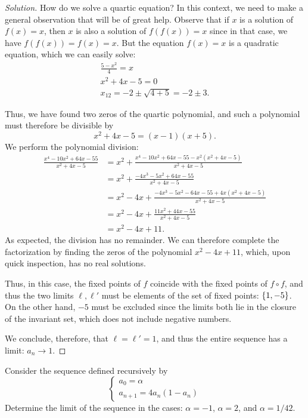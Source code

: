 \begin{proof}[Solution]
How do we solve a quartic equation?
In this context, we need to make a general observation that will be of great
help.
Observe that if $x$ is a solution of $f(x)=x$, then $x$
is also a solution of $f(f(x)) = x$ since in that case, we have
$f(f(x))=f(x)=x$.
But the equation $f(x) = x$ is a quadratic equation, which we can easily solve:
\begin{gather*}
  \frac{5-x^2}{4} = x \\
  x^2 + 4x - 5 = 0 \\
  x_{12} = -2 \pm \sqrt{4 + 5} = -2 \pm 3.
\end{gather*}

Thus, we have found two zeros of the quartic polynomial, and
such a polynomial must therefore be divisible by
\[
 x^2 + 4x - 5 = (x-1)(x+5).
\]
We perform the polynomial division:
\begin{align*}
\frac{x^4 - 10 x^2 + 64 x - 55}{x^2 + 4x - 5}
&= x^2 + \frac{x^4 - 10 x^2 + 64x - 55 - x^2 (x^2 + 4x - 5)}{x^2+4x-5}\\
&= x^2 + \frac{-4x^3 - 5 x^2 + 64 x - 55}{x^2+4x-5}\\
&= x^2 - 4x + \frac{-4x^3 - 5x^2 - 64 x - 55 + 4x(x^2+4x-5)}{x^2+4x-5}
\\
&= x^2 - 4x + \frac{11 x^2 + 44 x - 55}{x^2 + 4x -5}\\
&= x^2 - 4x + 11.
\end{align*}
As expected, the division has no remainder. We can therefore complete the
factorization by finding the zeros of the polynomial $x^2-4x+11$, which, upon
quick inspection, has no real solutions.

Thus, in this case, the fixed points of $f$ coincide with the fixed
points of $f\circ f$, and thus the two limits $\ell, \ell'$ must be
elements of the set of fixed points: ${\left\{ 1, -5 \right\}}$. On the other hand, $-5$
must be excluded since the limits both lie in the closure of the
invariant set, which does not include negative numbers.

We conclude, therefore, that $\ell = \ell' = 1$, and thus the entire
sequence has a limit: $a_n \to 1$.
\end{proof}

\begin{exercise}\label{ex_7}
  Consider the sequence defined recursively by
  \[
  \begin{cases}
    a_0 = \alpha\\
    a_{n+1} = 4 a_n (1-a_n) %
  \end{cases}
  \]
  Determine the limit of the sequence in the cases: 
  $\alpha=-1$, 
  $\alpha=2$, and 
  $\alpha=1/42$.
\end{exercise}



